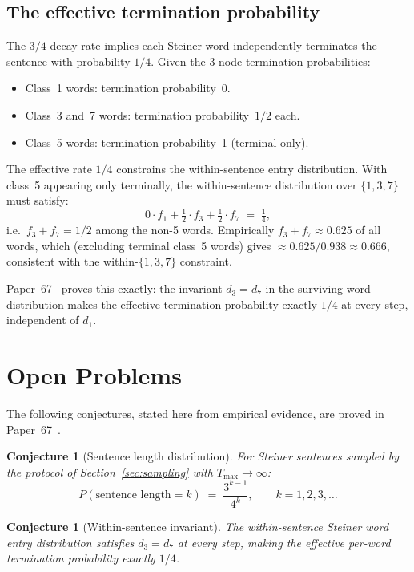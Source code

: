 \documentclass[12pt]{article}
\newtheorem{conjecture}[theorem]{Conjecture}
\theoremstyle{definition}
\theoremstyle{remark}
\begin{document}
\subsection{The effective termination probability}

The $3/4$ decay rate implies each Steiner word independently terminates the
sentence with probability $1/4$. Given the 3-node termination probabilities:
\begin{itemize}
  \item Class~1 words: termination probability~0.
  \item Class~3 and~7 words: termination probability~$1/2$ each.
  \item Class~5 words: termination probability~1 (terminal only).
\end{itemize}
The effective rate $1/4$ constrains the within-sentence entry distribution.
With class~5 appearing only terminally, the within-sentence distribution over
$\{1,3,7\}$ must satisfy:
\[
  0 \cdot f_1 + \tfrac{1}{2} \cdot f_3 + \tfrac{1}{2} \cdot f_7 \;=\; \tfrac{1}{4},
\]
i.e.\ $f_3 + f_7 = 1/2$ among the non-5 words. Empirically $f_3 + f_7 \approx 0.625$
of all words, which (excluding terminal class~5 words) gives $\approx 0.625/0.938
\approx 0.666$, consistent with the within-$\{1,3,7\}$ constraint.

Paper~67~\cite{paper67} proves this exactly: the invariant $d_3 = d_7$ in the
surviving word distribution makes the effective termination probability exactly
$1/4$ at every step, independent of $d_1$.

\section{Open Problems}
\label{sec:open}

The following conjectures, stated here from empirical evidence, are proved
in Paper~67~\cite{paper67}.

\begin{conjecture}[Sentence length distribution]
\label{conj:sentence}
For Steiner sentences sampled by the protocol of Section~\ref{sec:sampling}
with $T_{\max} \to \infty$:
\[
  P(\text{sentence length} = k) \;=\; \frac{3^{k-1}}{4^k}, \qquad k = 1, 2, 3, \ldots
\]
\end{conjecture}

\begin{conjecture}[Within-sentence invariant]
\label{conj:invariant}
The within-sentence Steiner word entry distribution satisfies $d_3 = d_7$ at
every step, making the effective per-word termination probability exactly $1/4$.
\end{conjecture}
\end{document}
